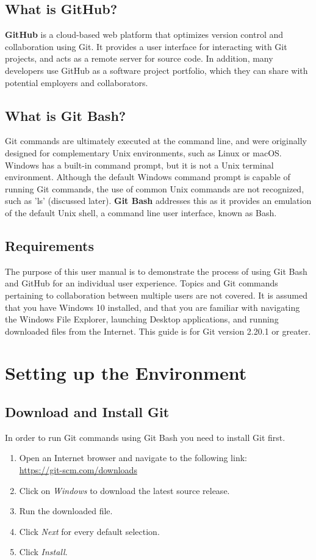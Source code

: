 \documentclass[12pt]{article}
\begin{document}
\subsection{What is GitHub?}
\textbf{GitHub} is a cloud-based web platform that optimizes version control and collaboration using Git. It provides a user interface for interacting with Git projects, and acts as a remote server for source code. In addition, many developers use GitHub as a software project portfolio, which they can share with potential employers and collaborators.

\subsection{What is Git Bash?}
Git commands are ultimately executed at the command line, and were originally designed for complementary Unix environments, such as Linux or macOS. Windows has a built-in command prompt, but it is not a Unix terminal environment. Although the default Windows command prompt is capable of running Git commands, the use of common Unix commands are not recognized, such as 'ls' (discussed later). \textbf{Git Bash} addresses this as it provides an emulation of the default Unix shell, a command line user interface, known as Bash. 

\subsection{Requirements}
The purpose of this user manual is to demonstrate the process of using Git Bash and GitHub for an individual user experience. Topics and Git commands pertaining to collaboration between multiple users are not covered. It is assumed that you have Windows 10 installed, and that you are familiar with navigating the Windows File Explorer, launching Desktop applications, and running downloaded files from the Internet. This guide is for Git version 2.20.1 or greater.

\section{Setting up the Environment}
\subsection{Download and Install Git}
In order to run Git commands using Git Bash you need to install Git first.
\begin{enumerate}
  \item Open an Internet browser and navigate to the following link: \\
        \href{https://git-scm.com/downloads}{https://git-scm.com/downloads}
  \item Click on \emph{Windows} to download the latest source release.
  \item Run the downloaded file.
  \item Click \emph{Next} for every default selection.
  \item Click \emph{Install}.
\end{enumerate}
\end{document}

